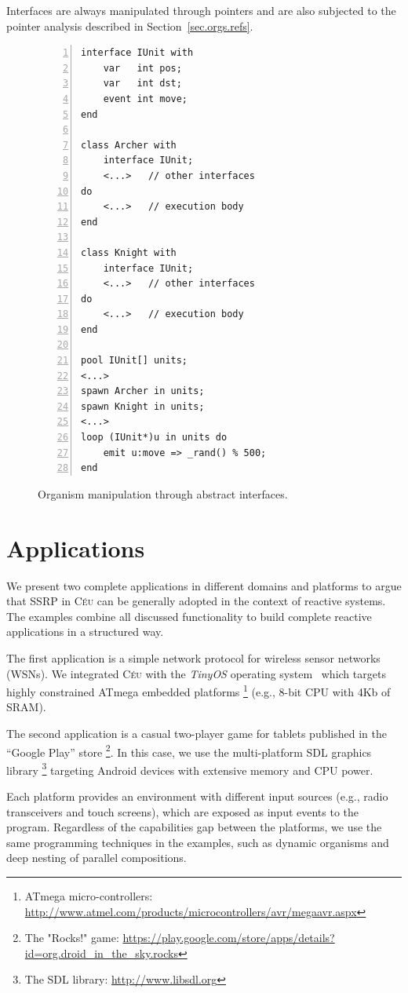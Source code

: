 \documentclass[preprint]{sigplanconf}
\newcommand{\CEU}{\textsc{C\'{e}u}\xspace}
\newcommand{\1}{\;}
\newcommand{\2}{\;\;}
\newcommand{\3}{\;\;\;}
\newcommand{\5}{\;\;\;\;\;}
\begin{document}
Interfaces are always manipulated through pointers and are also subjected to 
the pointer analysis described in Section~\ref{sec.orgs.refs}.

\begin{figure}%
\begin{lstlisting}[numbers=left,xleftmargin=3em]
interface IUnit with
    var   int pos;
    var   int dst;
    event int move;
end

class Archer with
    interface IUnit;
    <...>   // other interfaces
do
    <...>   // execution body
end

class Knight with
    interface IUnit;
    <...>   // other interfaces
do
    <...>   // execution body
end

pool IUnit[] units;
<...>
spawn Archer in units;
spawn Knight in units;
<...>
loop (IUnit*)u in units do
    emit u:move => _rand() % 500;
end
\end{lstlisting}
\caption{ Organism manipulation through abstract interfaces.
\label{lst.interfaces}
}
\end{figure}

\section{Applications}
\label{sec.apps}

We present two complete applications in different domains and platforms to 
argue that SSRP in \CEU can be generally adopted in the context of reactive 
systems.
The examples combine all discussed functionality to build complete reactive 
applications in a structured way.

The first application is a simple network protocol for wireless sensor networks 
(WSNs).
We integrated \CEU with the \emph{TinyOS} operating system~\cite{wsn.tos} which 
targets highly constrained ATmega embedded platforms%
\footnote{ATmega micro-controllers: 
\url{http://www.atmel.com/products/microcontrollers/avr/megaavr.aspx}}
(e.g., 8-bit CPU with 4Kb of SRAM).

The second application is a casual two-player game for tablets published in the 
``Google Play'' store%
\footnote{The "Rocks!" game: 
\url{https://play.google.com/store/apps/details?id=org.droid_in_the_sky.rocks}}.
In this case, we use the multi-platform SDL graphics library%
\footnote{The SDL library: \url{http://www.libsdl.org}} targeting Android 
devices with extensive memory and CPU power.

Each platform provides an environment with different input sources (e.g., radio 
transceivers and touch screens), which are exposed as input events to the 
program.
%
Regardless of the capabilities gap between the platforms, we use the same 
programming techniques in the examples, such as dynamic organisms and deep 
nesting of parallel compositions.
\end{document}
